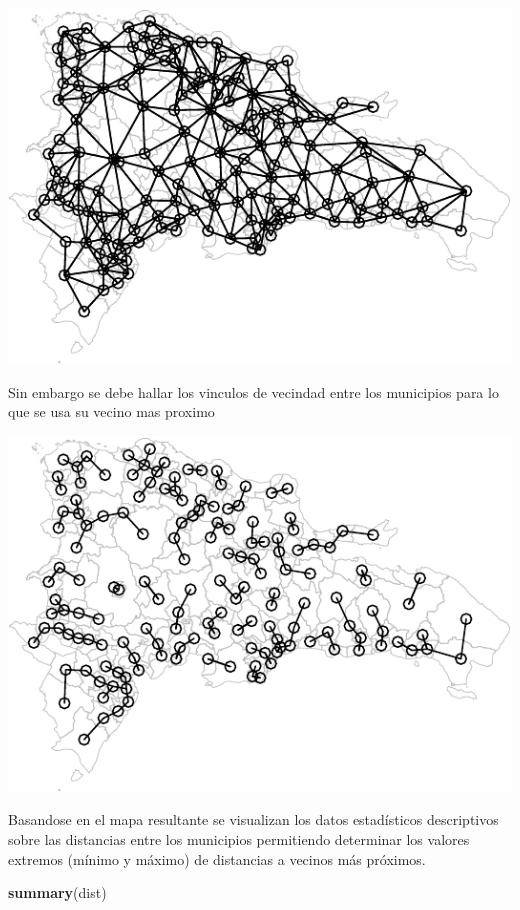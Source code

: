 \documentclass[11pt,]{article}
\newenvironment{Shaded}{\begin{snugshade}}{\end{snugshade}}
\newcommand{\KeywordTok}[1]{\textcolor[rgb]{0.13,0.29,0.53}{\textbf{#1}}}
\newcommand{\NormalTok}[1]{#1}
\begin{document}
\includegraphics{proyecto_files/figure-latex/unnamed-chunk-10-1.pdf}

Sin embargo se debe hallar los vinculos de vecindad entre los municipios
para lo que se usa su vecino mas proximo

\includegraphics{proyecto_files/figure-latex/unnamed-chunk-12-1.pdf}

Basandose en el mapa resultante se visualizan los datos estadísticos
descriptivos sobre las distancias entre los municipios permitiendo
determinar los valores extremos (mínimo y máximo) de distancias a
vecinos más próximos.

\begin{Shaded}
\begin{Highlighting}[]
\KeywordTok{summary}\NormalTok{(dist)}
\end{Highlighting}
\end{Shaded}
\end{document}
